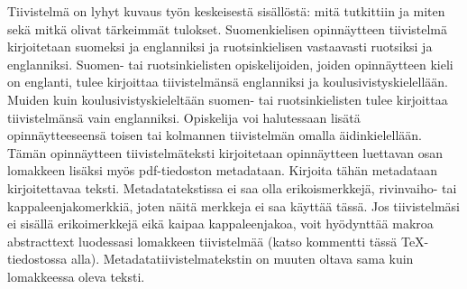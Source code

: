 \documentclass[english, 12pt, a4paper, sci, utf8, a-2b, online]{aaltothesis}
\date{1 June 2023}
\begin{document}
\makecoverpage

\makecopyrightpage

\clearpage


\begin{abstractpage}[english]
  \abstracttext{}
\end{abstractpage}

\newpage
\date{1.6.2023}
\begin{abstractpage}[finnish]
Tiivistelmä on lyhyt kuvaus työn keskeisestä sisällöstä: mitä tutkittiin ja
miten sekä mitkä olivat tärkeimmät tulokset. Suomenkielisen opinnäytteen
tiivistelmä kirjoitetaan suomeksi ja englanniksi ja ruotsinkielisen vastaavasti
ruotsiksi ja englanniksi. Suomen- tai ruotsinkielisten opiskelijoiden, joiden
opinnäytteen kieli on englanti, tulee kirjoittaa tiivistelmänsä englanniksi ja
koulusivistyskielellään. Muiden kuin koulusivistyskieleltään suomen- tai
ruotsinkielisten tulee kirjoittaa tiivistelmänsä vain englanniksi. Opiskelija
voi halutessaan lisätä opinnäytteeseensä toisen tai kolmannen tiivistelmän
omalla äidinkielellään.
Tämän opinnäytteen tiivistelmäteksti kirjoitetaan opinnäytteen luettavan osan
lomakkeen lisäksi myös pdf-tiedoston metadataan. Kirjoita tähän metadataan
kirjoitettavaa teksti. Metadatatekstissa ei saa olla erikoismerkkejä,
rivinvaiho- tai kappaleenjakomerkkiä, joten näitä merkkeja ei saa käyttää tässä.
Jos tiivistelmäsi ei sisällä erikoimerkkejä eikä kaipaa kappaleenjakoa, voit
hyödynttää makroa abstracttext luodessasi lomakkeen tiivistelmää (katso
kommentti tässä TeX-tiedostossa alla). Metadatatiivistelmatekstin on muuten
oltava sama kuin lomakkeessa oleva teksti.

\end{abstractpage}
\end{document}
